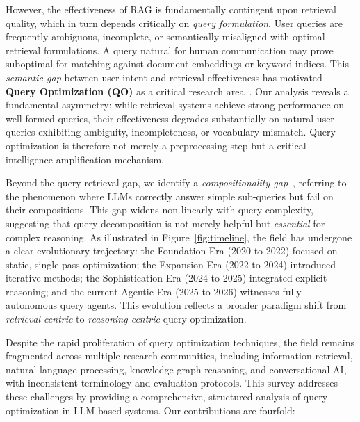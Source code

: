 \documentclass{article}
\begin{document}
However, the effectiveness of RAG is fundamentally contingent upon retrieval quality, which in turn depends critically on \textit{query formulation}. User queries are frequently ambiguous, incomplete, or semantically misaligned with optimal retrieval formulations. A query natural for human communication may prove suboptimal for matching against document embeddings or keyword indices. This \textit{semantic gap} between user intent and retrieval effectiveness has motivated \textbf{Query Optimization (QO)} as a critical research area~\citep{query_expansion_survey1,query_expansion_survey2}. Our analysis reveals a fundamental asymmetry: while retrieval systems achieve strong performance on well-formed queries, their effectiveness degrades substantially on natural user queries exhibiting ambiguity, incompleteness, or vocabulary mismatch. Query optimization is therefore not merely a preprocessing step but a critical intelligence amplification mechanism.

Beyond the query-retrieval gap, we identify a \textit{compositionality gap}~\citep{Self-Ask}, referring to the phenomenon where LLMs correctly answer simple sub-queries but fail on their compositions. This gap widens non-linearly with query complexity, suggesting that query decomposition is not merely helpful but \textit{essential} for complex reasoning. As illustrated in Figure~\ref{fig:timeline}, the field has undergone a clear evolutionary trajectory: the Foundation Era (2020 to 2022) focused on static, single-pass optimization; the Expansion Era (2022 to 2024) introduced iterative methods; the Sophistication Era (2024 to 2025) integrated explicit reasoning; and the current Agentic Era (2025 to 2026) witnesses fully autonomous query agents. This evolution reflects a broader paradigm shift from \textit{retrieval-centric} to \textit{reasoning-centric} query optimization.

Despite the rapid proliferation of query optimization techniques, the field remains fragmented across multiple research communities, including information retrieval, natural language processing, knowledge graph reasoning, and conversational AI, with inconsistent terminology and evaluation protocols. This survey addresses these challenges by providing a comprehensive, structured analysis of query optimization in LLM-based systems. Our contributions are fourfold:
\end{document}
